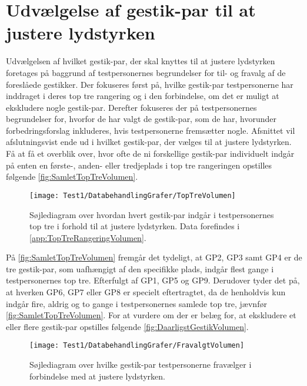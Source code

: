 \section{Udvælgelse af gestik-par til at justere lydstyrken}
\label{TestresultaterVolumen}
%
Udvælgelsen af hvilket gestik-par, der skal knyttes til at justere lydstyrken foretages på baggrund af testpersonernes begrundelser for til- og fravalg af de foreslåede gestikker. Der fokuseres først på, hvilke gestik-par testpersonerne har inddraget i deres top tre rangering og i den forbindelse, om det er muligt at ekskludere nogle gestik-par. Derefter fokuseres der på testpersonernes begrundelser for, hvorfor de har valgt de gestik-par, som de har, hvorunder forbedringsforslag inkluderes, hvis testpersonerne fremsætter nogle. Afsnittet vil afslutningsvist ende ud i hvilket gestik-par, der vælges til at justere lydstyrken.\blankline
%
Få at få et overblik over, hvor ofte de ni forskellige gestik-par individuelt indgår på enten en første-, anden- eller tredjeplads i top tre rangeringen opstilles følgende \autoref{fig:SamletTopTreVolumen}.
%
\begin{figure}[H]
	\centering
	\texttt{[image: Test1/DatabehandlingGrafer/TopTreVolumen]}
	\caption{Søjlediagram over hvordan hvert gestik-par indgår i testpersonernes top tre i forhold til at justere lydstyrken. Data forefindes i \autoref{app:TopTreRangeringVolumen}.}
	\label{fig:SamletTopTreVolumen}
\end{figure}
\noindent
%
På \autoref{fig:SamletTopTreVolumen} fremgår det tydeligt, at GP2, GP3 samt GP4 er de tre gestik-par, som uafhængigt af den specifikke plads, indgår flest gange i testpersonernes top tre. Efterfulgt af GP1, GP5 og GP9. Derudover tyder det på, at hverken GP6, GP7 eller GP8 er specielt eftertragtet, da de henholdvis kun indgår fire, aldrig og to gange i testpersonernes samlede top tre, jævnfør \autoref{fig:SamletTopTreVolumen}. For at vurdere om der er belæg for, at ekskludere et eller flere gestik-par opstilles følgende \autoref{fig:DaarligstGestikVolumen}. 
%
\begin{figure}[H]
	\centering
	\texttt{[image: Test1/DatabehandlingGrafer/FravalgtVolumen]}
	\caption{Søjlediagram over hvilke gestik-par testpersonerne fravælger i forbindelse med at justere lydstyrken.}
	\label{fig:DaarligstGestikVolumen}
\end{figure}
\noindent
%
